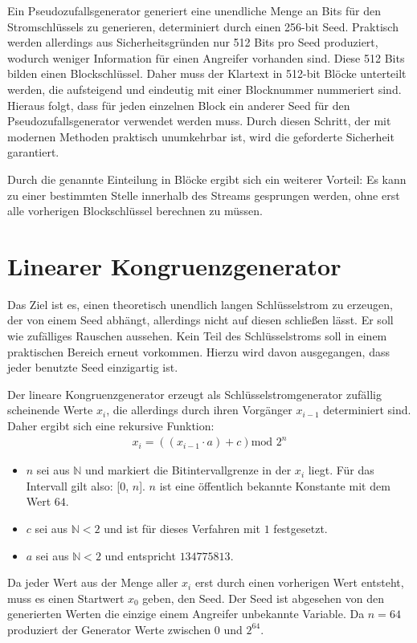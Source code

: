 \documentclass[10pt,a4paper]{article}
\begin{document}
\medskip
Ein Pseudozufallsgenerator generiert eine unendliche Menge an Bits für den Stromschlüssels zu generieren, determiniert durch einen 256-bit Seed.
Praktisch werden allerdings aus Sicherheitsgründen nur 512 Bits pro Seed produziert, wodurch weniger Information für einen Angreifer vorhanden sind.
Diese 512 Bits bilden einen Blockschlüssel.
Daher muss der Klartext in 512-bit Blöcke unterteilt werden, die aufsteigend und eindeutig mit einer Blocknummer nummeriert sind.
Hieraus folgt, dass für jeden einzelnen Block ein anderer Seed für den Pseudozufallsgenerator verwendet werden muss.
Durch diesen Schritt, der mit modernen Methoden praktisch unumkehrbar ist, wird die geforderte Sicherheit garantiert.

Durch die genannte Einteilung in Blöcke ergibt sich ein weiterer Vorteil:
Es kann zu einer bestimmten Stelle innerhalb des Streams gesprungen werden, ohne erst alle vorherigen Blockschlüssel berechnen zu müssen.

\section{Linearer Kongruenzgenerator}

Das Ziel ist es, einen theoretisch unendlich langen Schlüsselstrom zu erzeugen, der von einem Seed abhängt, allerdings nicht auf diesen schließen lässt.
Er soll wie zufälliges Rauschen aussehen.
Kein Teil des Schlüsselstroms soll in einem praktischen Bereich erneut vorkommen.
Hierzu wird davon ausgegangen, dass jeder benutzte Seed einzigartig ist.

\medskip
Der lineare Kongruenzgenerator erzeugt als Schlüsselstromgenerator zufällig scheinende Werte $x_i$, die allerdings durch ihren Vorgänger $x_{i-1}$ determiniert sind.
Daher ergibt sich eine rekursive Funktion:
\begin{align*}
    x_i = \left(\left(x_{i-1} \cdot a\right) + c\right) \text{mod } 2^n
\end{align*}
\begin{itemize}
    \item $n$ sei aus $\mathbb{N}$ und markiert die Bitintervallgrenze in der $x_i$ liegt.
          Für das Intervall gilt also: [0, $n$].
          $n$ ist eine öffentlich bekannte Konstante mit dem Wert $64$.
    \item $c$ sei aus $\mathbb{N}<2$ und ist für dieses Verfahren mit $1$ festgesetzt.
    \item $a$ sei aus $\mathbb{N}<2$ und entspricht $134775813$.
\end{itemize}
Da jeder Wert aus der Menge aller $x_i$ erst durch einen vorherigen Wert entsteht, muss es einen Startwert $x_0$ geben, den Seed.
Der Seed ist abgesehen von den generierten Werten die einzige einem Angreifer unbekannte Variable.
Da $n = 64$ produziert der Generator Werte zwischen $0$ und $2^{64}$.
\end{document}
